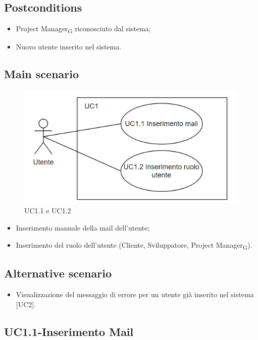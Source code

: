 \documentclass{article}
\begin{document}
            \subsection*{Postconditions}
        \begin{itemize}
            \item Project Manager\textsubscript{G} riconosciuto dal sistema;
            \item Nuovo utente inserito nel sistema.
        \end{itemize}
    \subsection*{Main scenario}
   \begin{figure}[H]
      \centering
      \includegraphics{documenti/imgUML/UC1-SOTTOCASI.png}
      \caption{UC1.1 e UC1.2}
      \label{fig:UC1,1 e UC1.2}
    \end{figure} 
        \begin{itemize}
            \item Inserimento manuale della mail dell'utente;
            \item Inserimento del ruolo dell'utente (Cliente, Sviluppatore, Project Manager\textsubscript{G}).
        \end{itemize}
    \subsection*{Alternative scenario}
        \begin{itemize}
            \item Visualizzazione del messaggio di errore per un utente già inserito nel sistema [UC2].
        \end{itemize}

\subsection{UC1.1-Inserimento Mail}
    
\end{document}
